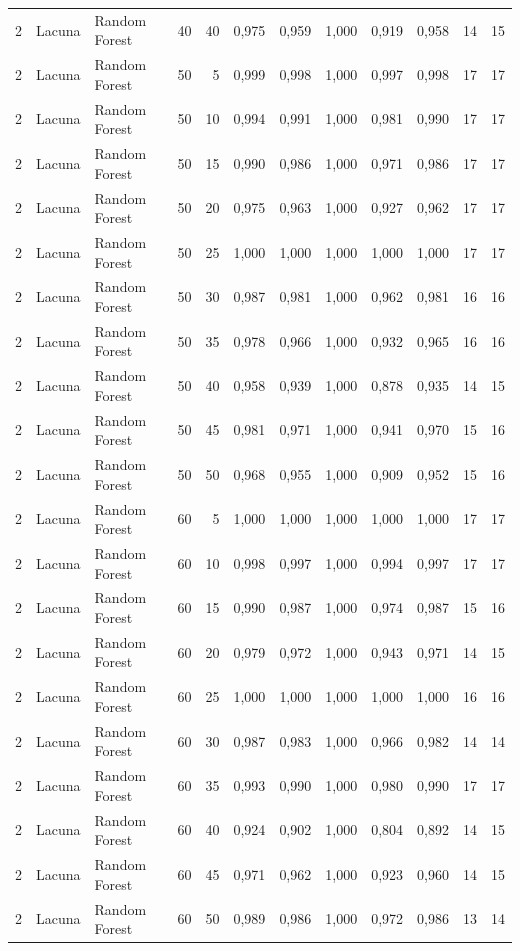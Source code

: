 \begin{longtable}{@{}rllrrrrrrrrr@{}}
2 & Lacuna & Random Forest & 40 & 40 & 0,975 & 0,959 & 1,000 & 0,919 & 0,958 & 14 & 15 \\
2 & Lacuna & Random Forest & 50 & 5 & 0,999 & 0,998 & 1,000 & 0,997 & 0,998 & 17 & 17 \\
2 & Lacuna & Random Forest & 50 & 10 & 0,994 & 0,991 & 1,000 & 0,981 & 0,990 & 17 & 17 \\
2 & Lacuna & Random Forest & 50 & 15 & 0,990 & 0,986 & 1,000 & 0,971 & 0,986 & 17 & 17 \\
2 & Lacuna & Random Forest & 50 & 20 & 0,975 & 0,963 & 1,000 & 0,927 & 0,962 & 17 & 17 \\
2 & Lacuna & Random Forest & 50 & 25 & 1,000 & 1,000 & 1,000 & 1,000 & 1,000 & 17 & 17 \\
2 & Lacuna & Random Forest & 50 & 30 & 0,987 & 0,981 & 1,000 & 0,962 & 0,981 & 16 & 16 \\
2 & Lacuna & Random Forest & 50 & 35 & 0,978 & 0,966 & 1,000 & 0,932 & 0,965 & 16 & 16 \\
2 & Lacuna & Random Forest & 50 & 40 & 0,958 & 0,939 & 1,000 & 0,878 & 0,935 & 14 & 15 \\
2 & Lacuna & Random Forest & 50 & 45 & 0,981 & 0,971 & 1,000 & 0,941 & 0,970 & 15 & 16 \\
2 & Lacuna & Random Forest & 50 & 50 & 0,968 & 0,955 & 1,000 & 0,909 & 0,952 & 15 & 16 \\
2 & Lacuna & Random Forest & 60 & 5 & 1,000 & 1,000 & 1,000 & 1,000 & 1,000 & 17 & 17 \\
2 & Lacuna & Random Forest & 60 & 10 & 0,998 & 0,997 & 1,000 & 0,994 & 0,997 & 17 & 17 \\
2 & Lacuna & Random Forest & 60 & 15 & 0,990 & 0,987 & 1,000 & 0,974 & 0,987 & 15 & 16 \\
2 & Lacuna & Random Forest & 60 & 20 & 0,979 & 0,972 & 1,000 & 0,943 & 0,971 & 14 & 15 \\
2 & Lacuna & Random Forest & 60 & 25 & 1,000 & 1,000 & 1,000 & 1,000 & 1,000 & 16 & 16 \\
2 & Lacuna & Random Forest & 60 & 30 & 0,987 & 0,983 & 1,000 & 0,966 & 0,982 & 14 & 14 \\
2 & Lacuna & Random Forest & 60 & 35 & 0,993 & 0,990 & 1,000 & 0,980 & 0,990 & 17 & 17 \\
2 & Lacuna & Random Forest & 60 & 40 & 0,924 & 0,902 & 1,000 & 0,804 & 0,892 & 14 & 15 \\
2 & Lacuna & Random Forest & 60 & 45 & 0,971 & 0,962 & 1,000 & 0,923 & 0,960 & 14 & 15 \\
2 & Lacuna & Random Forest & 60 & 50 & 0,989 & 0,986 & 1,000 & 0,972 & 0,986 & 13 & 14 \\

\end{longtable}
